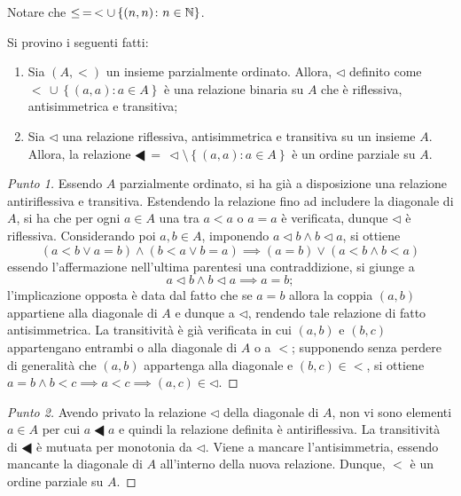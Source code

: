 Notare che \(\le\, =\, < \cup \left\lbrace (n,n) \colon n \in \mathbb{N} \right\rbrace\).

\begin{exe}
  Si provino i seguenti fatti:
  \begin{enumerate}
    \item Sia \((A, <)\) un insieme parzialmente ordinato. Allora, \(\lhd\) definito come  \(<\,\cup \left\lbrace (a,a) \colon a \in A \right\rbrace\) è una relazione binaria su \(A\) che è riflessiva, antisimmetrica e transitiva;
    \item Sia \(\lhd\) una relazione riflessiva, antisimmetrica e transitiva su un insieme \(A\). Allora, la relazione \(\LHD\, =\, \lhd \setminus \left\lbrace (a,a) \colon a \in A \right\rbrace\) è un ordine parziale su \(A\).
  \end{enumerate}
\end{exe}
\begin{proof}[Punto 1]
  Essendo \(A\) parzialmente ordinato, si ha già a disposizione una relazione antiriflessiva e transitiva. Estendendo la relazione fino ad includere la diagonale di \(A\), si ha che per ogni \(a \in A\) una tra \(a < a\) o \(a = a\) è verificata, dunque \(\lhd\) è riflessiva. Considerando poi \(a, b \in A\), imponendo \(a \lhd b \land b \lhd a\), si ottiene
  \[
  (a < b \lor a = b) \land (b < a \lor b = a) \implies (a = b) \lor (a < b \land b < a)
  \]
  essendo l'affermazione nell'ultima parentesi una contraddizione, si giunge a
  \[
  a \lhd b \land b \lhd a \implies a = b;
  \]
  l'implicazione opposta è data dal fatto che se \(a = b\) allora la coppia \((a,b)\) appartiene alla diagonale di \(A\) e dunque a \(\lhd\), rendendo tale relazione di fatto antisimmetrica. La transitività è già verificata in cui \((a,b)\) e \((b,c)\) appartengano entrambi o alla diagonale di \(A\) o a \(<\); supponendo senza perdere di generalità che \((a,b)\) appartenga alla diagonale e \((b,c) \in <\), si ottiene \(a = b \land b < c \implies a < c \implies (a,c) \in \lhd\).
\end{proof}
\begin{proof}[Punto 2]
Avendo privato la relazione \(\lhd\) della diagonale di \(A\), non vi sono elementi \(a \in A\) per cui \(a \LHD a\) e quindi la relazione definita è antiriflessiva. La transitività di \(\LHD\) è mutuata per monotonia da \(\lhd\). Viene a mancare l'antisimmetria, essendo mancante la diagonale di \(A\) all'interno della nuova relazione. Dunque, \(<\) è un ordine parziale su \(A\).
\end{proof}

